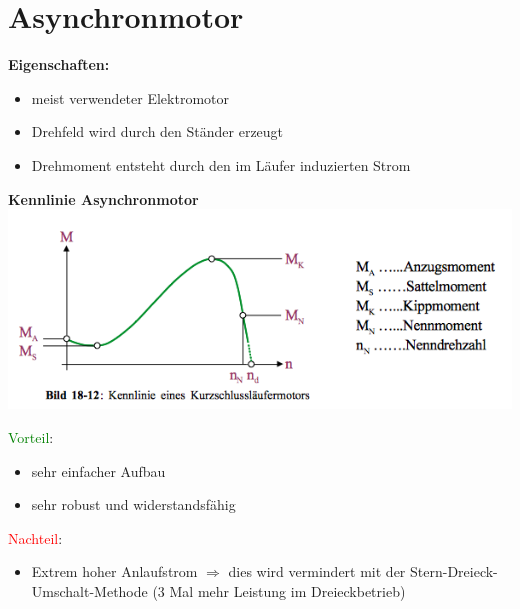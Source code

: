 \section{Asynchronmotor}
\renewcommand{\arraystretch}{0.9}  
\begin{minipage}{0.4\linewidth}
    \textbf{Eigenschaften:}
    \begin{itemize}
        \item meist verwendeter Elektromotor
        \item Drehfeld wird durch den Ständer erzeugt
        \item Drehmoment entsteht durch den im Läufer induzierten Strom
    \end{itemize}
\end{minipage}
\begin{minipage}{0.5\linewidth}
    \textbf{Kennlinie Asynchronmotor}\newline
    \includegraphics[scale = 0.6]{images/KennlinieASM}
\end{minipage}
\begin{multicols}{2}     
    \begin{minipage}{\linewidth}
        \textcolor{green}{Vorteil}:
        \begin{itemize}
            \item sehr einfacher Aufbau
            \item sehr robust und widerstandsfähig 
        \end{itemize}
    \end{minipage}
    
    \begin{minipage}{\linewidth}
        \textcolor{red}{Nachteil}:
        \begin{itemize}
            \item Extrem hoher Anlaufstrom \newline
            $\Rightarrow$ dies wird vermindert mit der Stern-Dreieck-Umschalt-Methode \newline
            (3 Mal mehr Leistung im Dreieckbetrieb)
        \end{itemize}
    \end{minipage}
\end{multicols}

